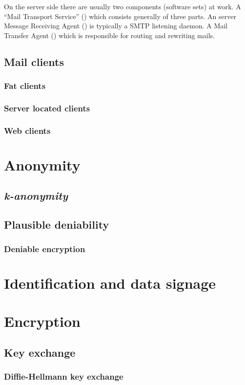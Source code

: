 On the server side there are usually two components (software sets) at work. A ``Mail Transport Service'' () which consists generally of three parts. An server Message Receiving Agent () is typically a SMTP listening daemon. A Mail Transfer Agent () which is responsible for routing and rewriting mails. 

\subsection{Mail clients}
\subsubsection{Fat clients}
\subsubsection{Server located clients}
\subsubsection{Web clients}

\section{Anonymity}
\subsection{\itshape{k}-anonymity}
\subsection{Plausible deniability}
\subsubsection{Deniable encryption}
\section{Identification and data signage}
\section{Encryption}
\subsection{Key exchange}
\subsubsection{Diffie-Hellmann key exchange}
